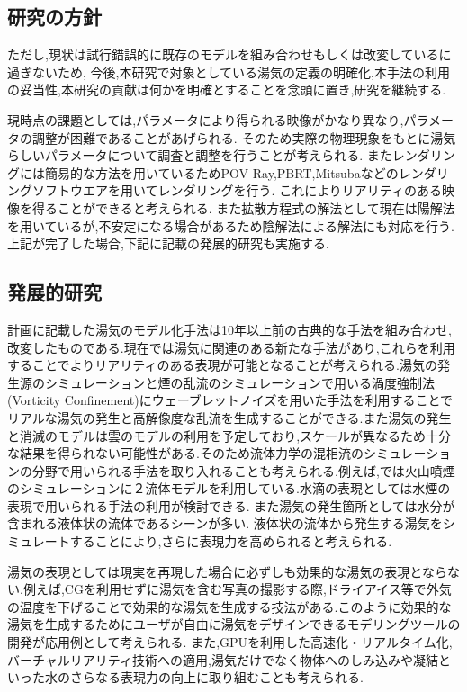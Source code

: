 


\subsection{研究の方針}

ただし,現状は試行錯誤的に既存のモデルを組み合わせもしくは改変しているに過ぎないため,
今後,本研究で対象としている湯気の定義の明確化,本手法の利用の妥当性,本研究の貢献は何かを明確とすることを念頭に置き,研究を継続する.


現時点の課題としては,パラメータにより得られる映像がかなり異なり,パラメータの調整が困難であることがあげられる.
そのため実際の物理現象をもとに湯気らしいパラメータについて調査と調整を行うことが考えられる.
またレンダリングには簡易的な方法を用いているためPOV-Ray,PBRT,Mitsubaなどのレンダリングソフトウエアを用いてレンダリングを行う.
これによりリアリティのある映像を得ることができると考えられる.
また拡散方程式の解法として現在は陽解法を用いているが,不安定になる場合があるため陰解法による解法にも対応を行う.
上記が完了した場合,下記に記載の発展的研究も実施する.

\subsection{発展的研究}
計画に記載した湯気のモデル化手法は10年以上前の古典的な手法を組み合わせ,改変したものである.現在では湯気に関連のある新たな手法があり,これらを利用することでよりリアリティのある表現が可能となることが考えられる.湯気の発生源のシミュレーションと煙の乱流のシミュレーションで用いる渦度強制法(Vorticity Confinement)にウェーブレットノイズを用いた手法\cite{Kim2008}を利用することでリアルな湯気の発生と高解像度な乱流を生成することができる.また湯気の発生と消滅のモデルは雲のモデルの利用を予定しており,スケールが異なるため十分な結果を得られない可能性がある.そのため流体力学の混相流のシミュレーションの分野で用いられる手法を取り入れることも考えられる.例えば,\cite{Mizuno2003}では火山噴煙のシミュレーションに２流体モデルを利用している.水滴の表現としては水煙の表現で用いられる手法\cite{Nielsen2013}の利用が検討できる.
また湯気の発生箇所としては水分が含まれる液体状の流体であるシーンが多い.
液体状の流体から発生する湯気をシミュレートすることにより,さらに表現力を高められると考えられる.

湯気の表現としては現実を再現した場合に必ずしも効果的な湯気の表現とならない.例えば,CGを利用せずに湯気を含む写真の撮影する際,ドライアイス等で外気の温度を下げることで効果的な湯気を生成する技法がある.このように効果的な湯気を生成するためにユーザが自由に湯気をデザインできるモデリングツールの開発が応用例として考えられる.
また,GPUを利用した高速化・リアルタイム化,バーチャルリアリティ技術への適用,湯気だけでなく物体へのしみ込みや凝結といった水のさらなる表現力の向上に取り組むことも考えられる.

